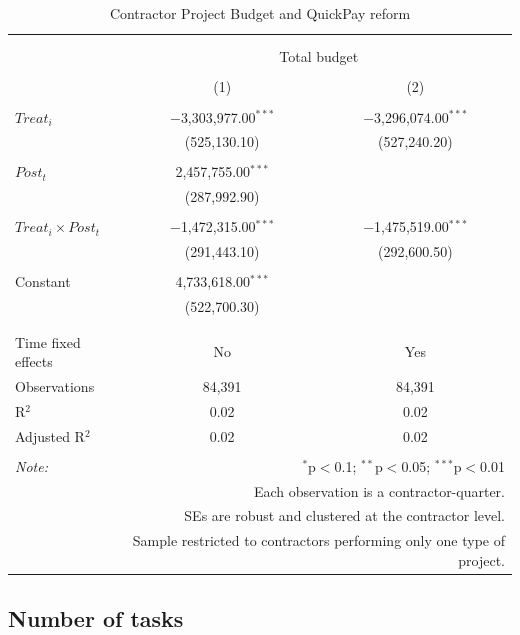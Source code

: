 \documentclass[
]{article}
\begin{document}
\begin{table}[H] \centering 
  \caption{Contractor Project Budget and QuickPay reform} 
  \label{} 
\small 
\begin{tabular}{@{\extracolsep{-2pt}}lcc} 
\\[-1.8ex]\hline 
\hline \\[-1.8ex] 
\\[-1.8ex] & \multicolumn{2}{c}{Total budget} \\ 
\\[-1.8ex] & (1) & (2)\\ 
\hline \\[-1.8ex] 
 $Treat_i$ & $-$3,303,977.00$^{***}$ & $-$3,296,074.00$^{***}$ \\ 
  & (525,130.10) & (527,240.20) \\ 
  & & \\ 
 $Post_t$ & 2,457,755.00$^{***}$ &  \\ 
  & (287,992.90) &  \\ 
  & & \\ 
 $Treat_i \times Post_t$ & $-$1,472,315.00$^{***}$ & $-$1,475,519.00$^{***}$ \\ 
  & (291,443.10) & (292,600.50) \\ 
  & & \\ 
 Constant & 4,733,618.00$^{***}$ &  \\ 
  & (522,700.30) &  \\ 
  & & \\ 
\hline \\[-1.8ex] 
Time fixed effects & No & Yes \\ 
Observations & 84,391 & 84,391 \\ 
R$^{2}$ & 0.02 & 0.02 \\ 
Adjusted R$^{2}$ & 0.02 & 0.02 \\ 
\hline 
\hline \\[-1.8ex] 
\textit{Note:}  & \multicolumn{2}{r}{$^{*}$p$<$0.1; $^{**}$p$<$0.05; $^{***}$p$<$0.01} \\ 
 & \multicolumn{2}{r}{Each observation is a contractor-quarter.} \\ 
 & \multicolumn{2}{r}{SEs are robust and clustered at the contractor level.} \\ 
 & \multicolumn{2}{r}{Sample restricted to contractors performing only one type of project.} \\ 
\end{tabular} 
\end{table}

\hypertarget{number-of-tasks}{%
\subsection{Number of tasks}\label{number-of-tasks}}
\end{document}
